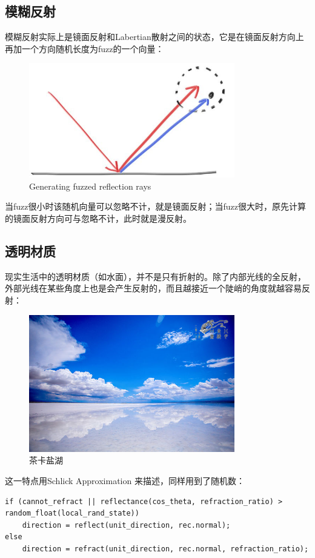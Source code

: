 \documentclass[UTF8, a4paper, 11pt]{article}
\begin{document}
\subsection{模糊反射}
模糊反射实际上是镜面反射和Labertian散射之间的状态，它是在镜面反射方向上再加一个方向随机长度为fuzz的一个向量：
\begin{figure}[H]
    \centering
    \includegraphics[width=0.8\textwidth]{reflect-fuzzy.jpg}
    \caption{Generating fuzzed reflection rays}
\end{figure}
当fuzz很小时该随机向量可以忽略不计，就是镜面反射；当fuzz很大时，原先计算的镜面反射方向可与忽略不计，此时就是漫反射。
\subsection{透明材质}
现实生活中的透明材质（如水面），并不是只有折射的。除了内部光线的全反射，外部光线在某些角度上也是会产生反射的，而且越接近一个陡峭的角度就越容易反射：
\begin{figure}[H]
    \centering
    \includegraphics[width=0.8\textwidth]{茶卡盐湖.jpg}
    \caption{茶卡盐湖}
\end{figure}
这一特点用Schlick Approximation
来描述，同样用到了随机数：
\begin{lstlisting}
if (cannot_refract || reflectance(cos_theta, refraction_ratio) > random_float(local_rand_state))
    direction = reflect(unit_direction, rec.normal);
else
    direction = refract(unit_direction, rec.normal, refraction_ratio);
\end{lstlisting}
\end{document}
